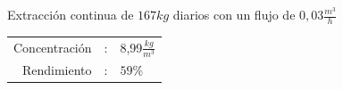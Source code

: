 \documentclass[aspectratio=1610]{beamer}
\begin{document}
\begin{frame}
\begin{columns}
\begin{itemize}
		\end{itemize}
		\begin{center}
		\tiny{
		Extracción continua de $167 kg$ diarios con un flujo de $0,03 \frac{m^3}{h}$\\}
		\begin{tabular}{rcl}
		Concentración &:&8,99$ \frac{kg}{m^3}$ \\
		Rendimiento &:& $59\%$ \\
		\end{tabular}
		\end{center}
	\end{columns}
\end{frame}
\end{document}
